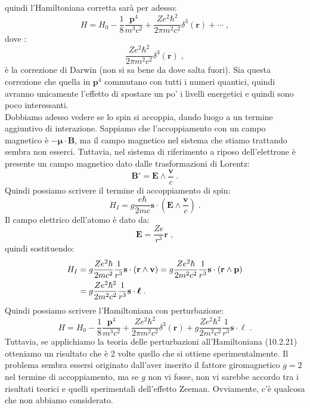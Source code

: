 \documentclass[12pt,a4paper]{report}
\theoremstyle{definition}
\numberwithin{equation}{section}
\begin{document}
quindi l'Hamiltoniana corretta sarà per adesso:
\begin{equation}
H=H_0-\frac{1}{8}\frac{\mathbf{p}^4}{m^3c^2}+\frac{Ze^2\hbar^2}{2\pi m^2c^2}\delta^3(\mathbf{r})+\cdots\;,
\end{equation}
dove :
\begin{equation}
\frac{Ze^2\hbar^2}{2\pi m^2c^2}\delta^3(\mathbf{r})\;,
\end{equation}
è la correzione di Darwin (non si sa bene da dove salta fuori). Sia questa correzione che quella in $\mathbf{p}^4$ commutano con tutti i numeri quantici, quindi avranno unicamente l'effetto di spostare un po' i livelli energetici e quindi sono poco interessanti.\\
Dobbiamo adesso vedere se lo spin si accoppia, dando luogo a un termine aggiuntivo di interazione. Sappiamo che l'accoppiamento con un campo magnetico è $-\boldsymbol{\mu}\cdot\mathbf{B}$, ma il campo magnetico nel sistema che stiamo trattando sembra non esserci. Tuttavia, nel sistema di riferimento a riposo dell'elettrone è presente un campo magnetico dato dalle trasformazioni di Lorentz:
\begin{equation}
\mathbf{B}'=\mathbf{E}\wedge \frac{\mathbf{v}}{c}\;.
\end{equation}
Quindi possiamo scrivere il termine di accoppiamento di spin:
\begin{equation}
H_I=g\frac{e\hbar}{2mc}\mathbf{s}\cdot\left(\mathbf{E}\wedge \frac{\mathbf{v}}{c}\right)\;.
\end{equation}
Il campo elettrico dell'atomo è dato da:
\begin{equation}
\mathbf{E}=\frac{Ze}{r^3}\mathbf{r}\;,
\end{equation}
quindi sostituendo:
\begin{align}
H_I &=g\frac{Ze^2\hbar}{2mc^2}\frac{1}{r^3}\mathbf{s}\cdot(\mathbf{r}\wedge\mathbf{v})=g\frac{Ze^2\hbar}{2m^2c^2}\frac{1}{r^3}\mathbf{s}\cdot(\mathbf{r}\wedge\mathbf{p}) \notag \\
&=g\frac{Ze^2\hbar^2}{2m^2c^2}\frac{1}{r^3}\mathbf{s}\cdot\boldsymbol{\ell}\;.
\end{align}
Quindi possiamo scrivere l'Hamiltoniana con perturbazione:
\begin{equation}
H=H_0-\frac{1}{8}\frac{\mathbf{p}^4}{m^3c^2}+\frac{Ze^2\hbar^2}{2\pi m^2c^2}\delta^3(\mathbf{r})+g\frac{Ze^2\hbar^2}{2m^2c^2}\frac{1}{r^3}\mathbf{s}\cdot\boldsymbol{\ell}\;.
\end{equation}
Tuttavia, se applichiamo la teoria delle perturbazioni all'Hamiltoniana (10.2.21) otteniamo un risultato che è 2 volte quello che si ottiene sperimentalmente. Il problema sembra essersi originato dall'aver inserito il fattore giromagnetico $g=2$ nel termine di accoppiamento, ma se $g$ non vi fosse, non vi sarebbe accordo tra i risultati teorici e quelli sperimentali dell'effetto Zeeman. Ovviamente, c'è qualcosa che non abbiamo considerato. \\
\end{document}

